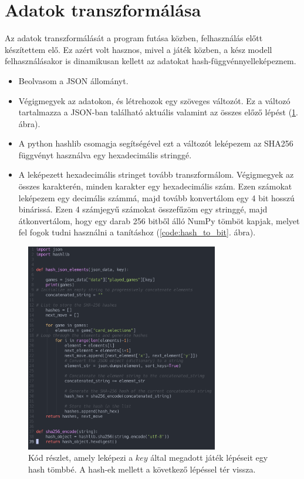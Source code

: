 \section{Adatok transzformálása}

Az adatok transzformálását a program futása közben, felhasználás előtt készítettem elő. Ez azért volt hasznos, mivel a játék közben, a kész modell felhasználásakor is dinamikusan kellett az adatokat hash-függvénnyelleképeznem.

\begin{itemize}
    \item Beolvasom a JSON állományt. 
    \item Végigmegyek az adatokon, és létrehozok egy szöveges változót. Ez a változó tartalmazza a JSON-ban található aktuális valamint az összes előző lépést  (\ref{code:json_to_hash}. ábra). 
    \item A python hashlib csomagja segítségével ezt a változót leképezem az SHA256 függvényt használva egy hexadecimális stringgé. 
    \item A leképezett hexadecimális stringet tovább transzformálom. 
    Végigmegyek az összes karakterén, minden karakter egy hexadecimális szám. Ezen számokat leképezem egy decimális számmá, majd tovább konvertálom egy 4 bit hosszú binárissá. Ezen 4 számjegyű számokat összefűzöm egy stringgé, majd átkonvertálom, hogy egy darab 256 bitből álló NumPy tömböt kapjak, melyet fel fogok tudni használni a tanításhoz (\ref{code:hash_to_bit}. ábra). 
\end{itemize}

\begin{figure}[h]
    \center
    \includegraphics[width=0.75\textwidth]{img/JSON_TO_SHA256.png}
    \caption{Kód részlet, amely leképezi a $key$ által megadott játék lépéseit egy hash tömbbé. A hash-ek mellett a következő lépéssel tér vissza.}
    \label{code:json_to_hash}
\end{figure}

